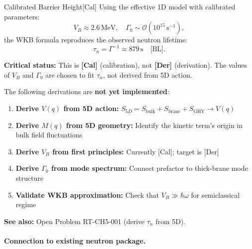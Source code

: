 \begin{edcPropositionBox}{Calibrated Barrier Height}{[Cal]}
\label{prop:B3_calibration}
Using the effective 1D model with calibrated parameters:
\begin{equation}
\label{eq:calibration}
V_B \approx 2.6\,\mathrm{MeV}, \quad \Gamma_0 \sim \mathcal{O}(10^{15}\,\mathrm{s}^{-1}),
\end{equation}
the WKB formula reproduces the observed neutron lifetime:
\begin{equation}
\tau_n = \Gamma^{-1} \approx 879\,\mathrm{s} \quad \text{[BL]}.
\end{equation}

\textbf{Critical status:} This is \textbf{[Cal]} (calibration), not \textbf{[Der]} (derivation).
The values of $V_B$ and $\Gamma_0$ are chosen to fit $\tau_n$, not derived from 5D action.
\end{edcPropositionBox}

\begin{tcolorbox}[colback=blue!5!white, colframe=blue!50!black,
                  title={\textbf{Remark B: What Is OPEN (5D Derivation Roadmap)}}]
\label{rem:routeB_open}
The following derivations are \textbf{not yet implemented}:
\begin{enumerate}[nosep]
  \item \textbf{Derive $V(q)$ from 5D action:} $S_{5D} = S_{\mathrm{bulk}} + S_{\mathrm{brane}}
        + S_{\mathrm{GHY}} \to V(q)$
  \item \textbf{Derive $M(q)$ from 5D geometry:} Identify the kinetic term's origin in
        bulk field fluctuations
  \item \textbf{Derive $V_B$ from first principles:} Currently [Cal]; target is [Der]
  \item \textbf{Derive $\Gamma_0$ from mode spectrum:} Connect prefactor to thick-brane
        mode structure
  \item \textbf{Validate WKB approximation:} Check that $V_B \gg \hbar\omega$ for
        semiclassical regime
\end{enumerate}

\textbf{See also:} Open Problem RT-CH5-001 (derive $\tau_n$ from 5D).
\end{tcolorbox}

\paragraph{Connection to existing neutron package.}

